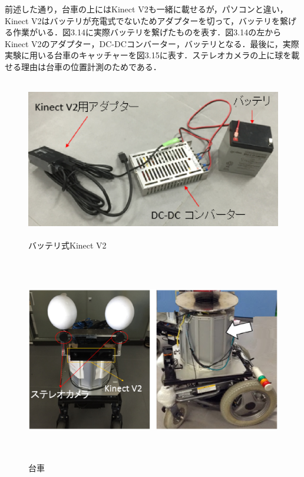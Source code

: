 前述した通り，台車の上にはKinect V2も一緒に載せるが，パソコンと違い，Kinect V2はバッテリが充電式でないためアダプターを切って，バッテリを繋げる作業がいる．図3.14に実際バッテリを繋げたものを表す．図3.14の左からKinect V2のアダプター，DC-DCコンバーター，バッテリとなる．最後に，実際実験に用いる台車のキャッチャーを図3.15に表す．ステレオカメラの上に球を載せる理由は台車の位置計測のためである．


\begin{figure}[htbp]
  \begin{center}
   \includegraphics[height=70mm]{figure/battery_kinectV2.eps}
   \caption{バッテリ式Kinect V2}
   \label{battery_kinectV2}
  \end{center}
\end{figure}

\begin{figure}[htbp]
  \begin{center}
   \includegraphics[height=90mm]{figure/台車.eps}
   \caption{台車}
   \label{台車}
  \end{center}
\end{figure}
\newpage

